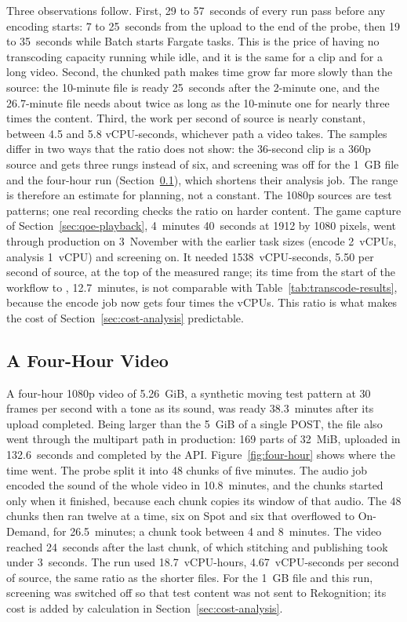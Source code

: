 Three observations follow. First, 29 to 57~seconds of every run pass before any encoding starts:
7 to 25~seconds from the upload to the end of the probe, then 19 to 35~seconds
while Batch starts Fargate tasks. This is the price of having no transcoding capacity running while idle, and it
is the same for a clip and for a long video. Second, the chunked path makes time grow far more slowly
than the source: the 10-minute file is ready 25~seconds after the 2-minute one, and the 26.7-minute
file needs about twice as long as the 10-minute one for nearly three times the content. Third, the
work per second of source is nearly constant, between 4.5 and 5.8 vCPU-seconds, whichever path a
video takes. The samples differ in two ways that the ratio does not show: the 36-second clip is a
360p source and gets three rungs instead of six, and screening was off for the 1~GB file and the
four-hour run (Section~\ref{sec:chunked-evaluation}), which shortens their analysis job. The range
is therefore an estimate for planning, not a constant. The 1080p sources are test patterns; one
real recording checks the ratio on harder content. The game capture of
Section~\ref{sec:qoe-playback}, 4~minutes 40~seconds at 1912 by 1080 pixels, went through production
on 3~November with the earlier task sizes (encode 2~vCPUs, analysis 1~vCPU) and screening on. It
needed 1538~vCPU-seconds, 5.50 per second of source, at the top of the measured range; its time
from the start of the workflow to , 12.7~minutes, is not comparable with
Table~\ref{tab:transcode-results}, because the encode job now gets four times the vCPUs. This ratio
is what makes the cost of Section~\ref{sec:cost-analysis} predictable.

\subsection{A Four-Hour Video}
\label{sec:chunked-evaluation}

A four-hour 1080p video of 5.26~GiB, a synthetic moving test pattern at 30 frames per second with a
tone as its sound, was ready 38.3~minutes after its upload completed. Being larger than the 5~GiB
of a single POST, the file also went through the multipart path in production: 169 parts of
32~MiB, uploaded in 132.6~seconds and completed by the API. Figure~\ref{fig:four-hour}
shows where the time went. The probe split it into 48 chunks of five minutes. The audio job encoded
the sound of the whole video in 10.8~minutes, and the chunks started only when it finished, because
each chunk copies its window of that audio. The 48 chunks then ran twelve at a time, six on Spot and
six that overflowed to On-Demand, for 26.5~minutes; a chunk took between 4 and 8~minutes. The video
reached 
24~seconds after the last chunk, of which stitching and publishing took under 3~seconds. The run used 18.7~vCPU-hours, 4.67~vCPU-seconds per second of source, the same ratio as
the shorter files. For the 1~GB file and this run, screening was switched off so that test content
was not sent to Rekognition; its cost is added by calculation in Section~\ref{sec:cost-analysis}.

